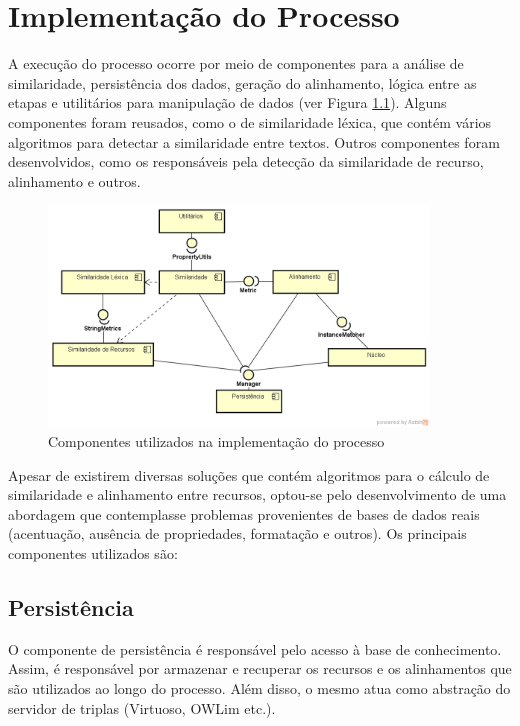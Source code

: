 \chapter{Implementação do Processo}

A execução do processo ocorre por meio de componentes para a análise de similaridade, persistência dos dados, geração do alinhamento, lógica entre as etapas e utilitários para manipulação de dados (ver Figura \ref{fig:componentes}). Alguns componentes foram reusados, como o de similaridade léxica, que contém vários algoritmos para detectar a similaridade entre textos. Outros componentes foram desenvolvidos, como os responsáveis pela detecção da similaridade de recurso, alinhamento e outros.

\begin{figure}[!ht]
	\centering
	\includegraphics[width=0.9\textwidth]{./imagens/componentes.png}
    \caption{Componentes utilizados na implementação do processo}
	\label{fig:componentes}
\end{figure}

Apesar de existirem diversas soluções que contém algoritmos para o cálculo de similaridade e alinhamento entre recursos, optou-se pelo desenvolvimento de uma abordagem que contemplasse problemas provenientes de bases de dados reais (acentuação, ausência de propriedades, formatação e outros).
Os principais componentes utilizados são:

\section*{Persistência}
O componente de persistência é responsável pelo acesso à base de conhecimento. Assim, é responsável por armazenar e recuperar os recursos e os alinhamentos que são utilizados ao longo do processo. Além disso, o mesmo atua como abstração do servidor de triplas (Virtuoso, OWLim etc.).

